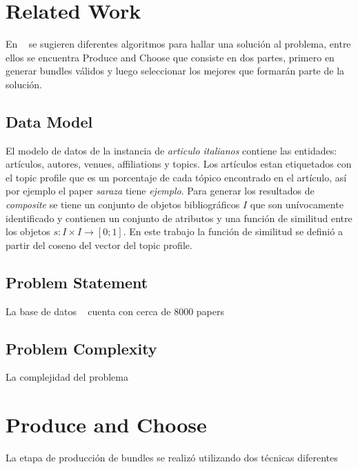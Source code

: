 \section{Related Work}
En ~\cite{compositeRetrival} se sugieren diferentes algoritmos para hallar una solución al problema, entre ellos se encuentra Produce and Choose que consiste en dos partes, primero en generar bundles válidos y luego seleccionar los mejores que formarán parte de la solución.
\subsection{Data Model}
El modelo de datos de la instancia de \textit{articulo italianos} contiene las entidades: artículos, autores, venues, affiliations y topics. Los artículos estan etiquetados con el topic profile que es un porcentaje de cada tópico encontrado en el artículo, así por ejemplo el paper \textit{saraza} tiene \textit{ejemplo}. Para generar los resultados de \textit{composite} se tiene un conjunto de objetos bibliográficos $I$ que son unívocamente identificado y contienen un conjunto de atributos y una función de similitud entre los objetos $ s: I \times I \rightarrow [0;1]$. En este trabajo la función de similitud se definió a partir del coseno del vector del topic profile.\\
\subsection{Problem Statement}
La base de datos ~\cite{dataDrive} cuenta con cerca de 8000 papers 
\subsection{Problem Complexity}
La complejidad del problema
\section{Produce and Choose}
La etapa de producción de bundles se realizó utilizando dos técnicas diferentes
